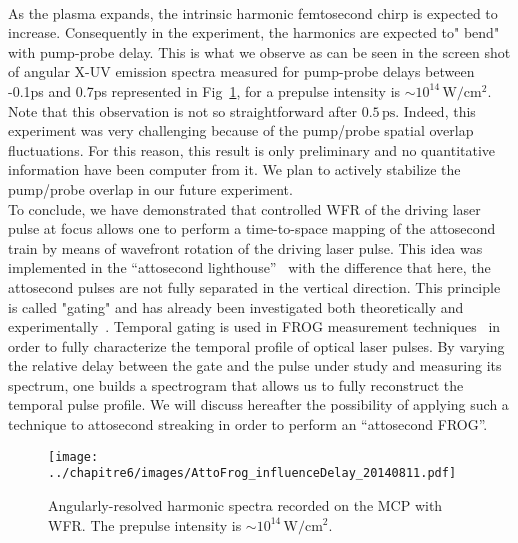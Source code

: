 \noindent {}\\
\noindent As the plasma expands, the intrinsic harmonic femtosecond chirp is expected to increase. Consequently in the experiment, the harmonics are expected to" bend"  with pump-probe delay. This is what we observe as can be seen in the screen shot of angular X-UV emission spectra measured for pump-probe delays between -0.1ps and 0.7ps represented in Fig~\ref{fig:AttoFrog_influenceDelay_20140811l}, for a  prepulse intensity is $\sim 10^{14}\,\mathrm{W/cm^2}$. Note that this observation is not so straightforward after $0.5\,\mathrm{ps}$. Indeed, this experiment was very challenging because of the pump/probe spatial overlap fluctuations. For this reason, this result is only preliminary and no quantitative information have been computer from it. We plan to actively stabilize the pump/probe overlap in our future experiment.\\

\noindent To conclude, we have demonstrated that controlled WFR of the driving laser pulse at focus allows one to perform a time-to-space mapping of the attosecond train by means of wavefront rotation of the driving laser pulse. 
This idea was implemented in the ``attosecond lighthouse''~\cite{Wheeler2012} with the difference that here, the attosecond pulses are not fully separated in the vertical direction. This principle is called "gating" and has already been investigated both theoretically and experimentally~\cite{TheseHenri,TheseSylvain}.
Temporal gating is used in FROG measurement techniques~\cite{Trebino1993} in order to fully characterize the temporal profile of optical laser pulses. By varying the relative delay between the gate and the pulse under study and measuring its spectrum, one builds a spectrogram that allows us to fully reconstruct the temporal pulse profile. We will discuss hereafter the possibility of applying such a technique to attosecond streaking in order to perform an ``attosecond FROG''.

\begin{figure}[H]
\centering
\texttt{[image: ../chapitre6/images/AttoFrog\_influenceDelay\_20140811.pdf]}\\
\caption{\label{fig:AttoFrog_influenceDelay_20140811l} Angularly-resolved harmonic spectra recorded on the MCP with WFR. The prepulse intensity is $\sim 10^{14}\,\mathrm{W/cm^2}$.}%
\end{figure}












